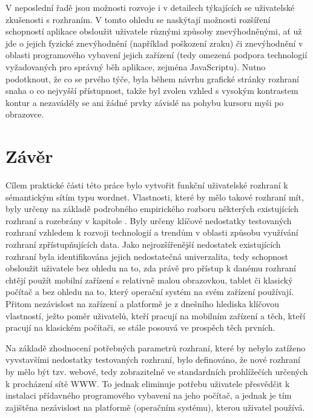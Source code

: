 \documentclass[a4paper, 11pt, oneside]{book}
\newcommand{\itNameRef}[1]{\textit{\nameref{#1}}}
\begin{document}
			V neposlední řadě jsou možnosti rozvoje i v detailech týkajících se uživatelské zkušenosti s rozhraním. V tomto ohledu se naskýtají možnosti rozšíření schopností aplikace obsloužit uživatele různými způsoby znevýhodněnými, ať už jde o jejich fyzické znevýhodnění (například poškození zraku) či znevýhodnění v oblasti programového vybavení jejich zařízení (tedy omezená podpora technologií vyžadovaných pro správný běh aplikace, zejména JavaScriptu). Nutno podotknout, že co se prvého týče, byla během návrhu grafické stránky rozhraní snaha o co nejvyšší přístupnost, takže byl zvolen vzhled s vysokým kontrastem kontur a nezaváděly se ani žádné prvky závislé na pohybu kursoru myši po obrazovce. 

		\chapter*{Závěr}\label{zaver}


			Cílem praktické části této práce bylo vytvořit funkční uživatelské rozhraní k sémantickým sítím typu wordnet. Vlastnosti, které by mělo takové rozhraní mít, byly určeny na základě podrobného empirického rozboru některých existujících rozhraní a rozebrány v kapitole \itNameRef{cha:navrh}. Byly určeny klíčové nedostatky testovaných rozhraní vzhledem k rozvoji technologií a trendům v oblasti způsobu využívání rozhraní zpřístupňujících data. Jako nejrozšířenější nedostatek existujících rozhraní byla identifikována jejich nedostatečná univerzalita, tedy schopnost obsloužit uživatele bez ohledu na to, zda právě pro přístup k danému rozhraní chtějí použít mobilní zařízení s relativně malou obrazovkou, tablet či klasický počítač a bez ohledu na to, který operační systém na svém zařízení používají. Přitom nezávislost na zařízení a platformě je z dnešního hlediska klíčovou vlastností, ježto poměr uživatelů, kteří pracují na mobilním zařízení a těch, kteří pracují na klasickém počítači, se stále posouvá ve prospěch těch prvních.

			Na základě zhodnocení potřebných parametrů rozhraní, které by nebylo zatíženo vyvstavšími nedostatky testovaných rozhraní, bylo definováno, že nové rozhraní by mělo být tzv. webové, tedy zobrazitelné ve standardních prohlížečích určených k procházení sítě WWW. To jednak eliminuje potřebu uživatele přesvědčit k instalaci přídavného programového vybavení na jeho počítač, a jednak je tím zajištěna nezávislost na platformě (operačním systému), kterou uživatel používá. 
\end{document}
